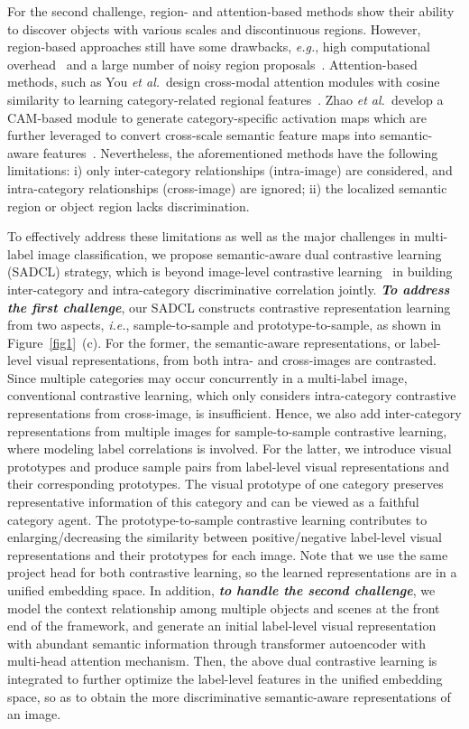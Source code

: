 \documentclass{ecai}
\def\ie{{\em i.e.}}
\def\eg{{\em e.g.}}
\def\etal{{\em et al.}}
\begin{document}
For the second challenge, region- and attention-based methods show their ability to discover objects with various scales and discontinuous regions. However, region-based approaches still have some drawbacks, \eg, high computational overhead~\cite{wu2021gm} and a large number of noisy region proposals~\cite{wei2015hcp}. 
Attention-based methods, such as You \etal~design cross-modal attention modules with cosine similarity to learning category-related regional features~\cite{you2020cma}.
Zhao \etal~develop a CAM-based module to generate category-specific activation maps which are further leveraged to convert cross-scale semantic feature maps into semantic-aware features~\cite{Zhao2021ICCV}. Nevertheless, the aforementioned methods have the following limitations: i) only inter-category relationships (intra-image) are considered, and intra-category relationships (cross-image) are ignored; ii) the localized semantic region or object region lacks discrimination.




To effectively address these limitations as well as the major challenges in multi-label image classification, we propose semantic-aware dual contrastive learning (SADCL) strategy, which is beyond image-level contrastive learning~\cite{khosla2020supervised} in building inter-category and intra-category discriminative correlation jointly. \textbf{\emph{To address the first challenge}},  our SADCL constructs contrastive representation learning from two aspects, \ie, sample-to-sample and prototype-to-sample, as shown in Figure~\ref{fig1}~(c). For the former, the semantic-aware representations, or label-level visual representations, from both intra- and cross-images are contrasted. Since multiple categories may occur concurrently in a multi-label image, conventional contrastive learning, which only considers intra-category contrastive representations from cross-image, is insufficient. Hence, we also add inter-category representations from multiple images for sample-to-sample contrastive learning, where modeling label correlations is involved. For the latter, we introduce visual prototypes and produce sample pairs from label-level visual representations and their corresponding prototypes. The visual prototype of one category preserves representative information of this category and can be viewed as a faithful category agent. The prototype-to-sample contrastive learning contributes to enlarging/decreasing the similarity between positive/negative label-level visual representations and their prototypes for each image. Note that we use the same project head for both contrastive learning, so the learned representations are in a unified embedding space. In addition, \textbf{\emph{to handle the second challenge}}, we model the context relationship among multiple objects and scenes at the front end of the framework, and generate an initial label-level visual representation with abundant semantic information through transformer autoencoder with multi-head attention mechanism. Then, the above dual contrastive learning is integrated to further optimize the label-level features in the unified embedding space, so as to obtain the more discriminative semantic-aware representations of an image.
\end{document}
